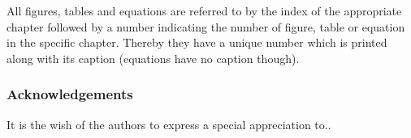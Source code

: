 All figures, tables and equations are referred to by the index of the appropriate chapter followed by a number indicating the number of figure, table or equation in the specific chapter. Thereby they have a unique number which is printed along with its caption (equations have no caption though).
\vspace{-0.5cm}
\subsubsection{Acknowledgements}
\vspace{-0.2cm}
It is the wish of the authors to express a special appreciation to..
\restoregeometry %
